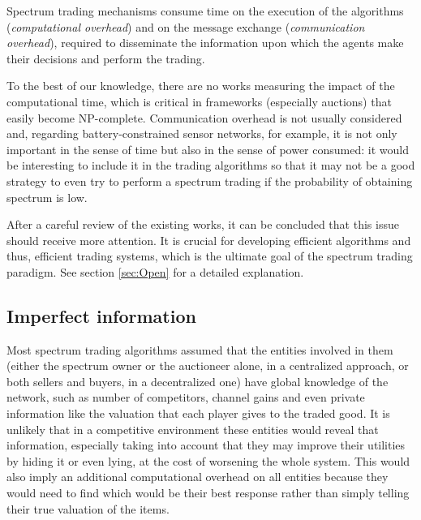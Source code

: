 Spectrum trading mechanisms consume time on the execution of the algorithms (\textit{computational overhead}) and on the message exchange (\textit{communication overhead}), required to disseminate the information upon which the agents make their decisions and perform the trading. 

To the best of our knowledge, there are no works measuring the impact of the computational time, which is critical in frameworks (especially auctions) that easily become NP-complete. 
Communication overhead is not usually considered \cite{ref:Xu2010,ref:Niyato2008_Mark} and, regarding battery-constrained sensor networks, for example, it is not only important in the sense of time but also in the sense of power consumed: it would be interesting to include it in the trading algorithms so that it may not be a good strategy to even try to perform a spectrum trading if the probability of obtaining spectrum is low. 

After a careful review of the existing works, it can be concluded that this issue should receive more attention. It is crucial for developing efficient algorithms and thus, efficient trading systems, which is the ultimate goal of the spectrum trading paradigm. See section \ref{sec:Open} for a detailed explanation. 

\subsection{Imperfect information}
\label{subsec:Imperfect}
Most spectrum trading algorithms assumed that the entities involved in them (either the spectrum owner or the auctioneer alone, in a centralized approach, or both sellers and buyers, in a decentralized one) have global knowledge of the network, such as number of competitors, channel gains and even private information like the valuation that each player gives to the traded good. It is unlikely that in a competitive environment these entities would reveal that information, especially taking into account that they may improve their utilities by hiding it or even lying, at the cost of worsening the whole system. This would also imply an additional computational overhead on all entities because they would need to find which would be their best response rather than simply telling their true valuation of the items.

